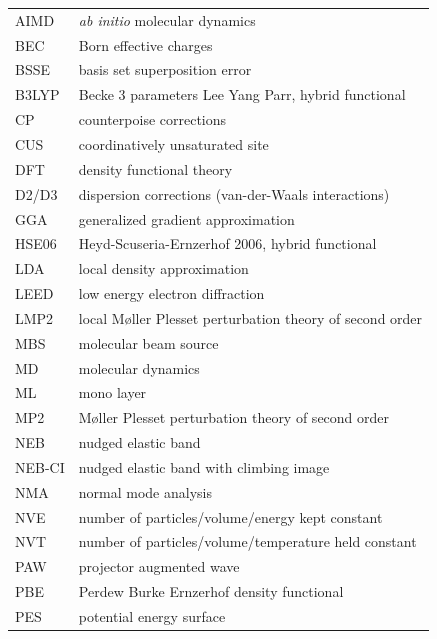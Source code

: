 \documentclass[11pt,DIV=13,BCOR=5mm,a4paper,headinclude]{scrbook}
\begin{document}
\clearpage
{}
\begin{table}[!h]
 \centering
  \begin{tabular}{ll}
AIMD & \textit{ab initio} molecular dynamics\\
BEC & Born effective charges\\
BSSE & basis set superposition error\\
B3LYP & Becke 3 parameters Lee Yang Parr, hybrid functional\\
CP & counterpoise corrections\\
CUS & coordinatively unsaturated site\\
DFT & density functional theory\\
D2/D3 & dispersion corrections (van-der-Waals interactions)\\
GGA & generalized gradient approximation\\
HSE06 & Heyd-Scuseria-Ernzerhof 2006, hybrid functional\\
LDA & local density approximation\\
LEED & low energy electron diffraction\\
LMP2 & local M\o{}ller Plesset perturbation theory of second order\\
MBS & molecular beam source\\
MD & molecular dynamics\\
ML & mono layer\\
MP2 & M\o{}ller Plesset perturbation theory of second order\\
NEB & nudged elastic band\\
NEB-CI & nudged elastic band with climbing image\\
NMA & normal mode analysis\\
NVE & number of particles/volume/energy kept constant\\
NVT & number of particles/volume/temperature held constant\\
PAW & projector augmented wave\\
PBE & Perdew Burke Ernzerhof density functional\\
PES & potential energy surface\\

\end{tabular}
\end{table}
\end{document}
